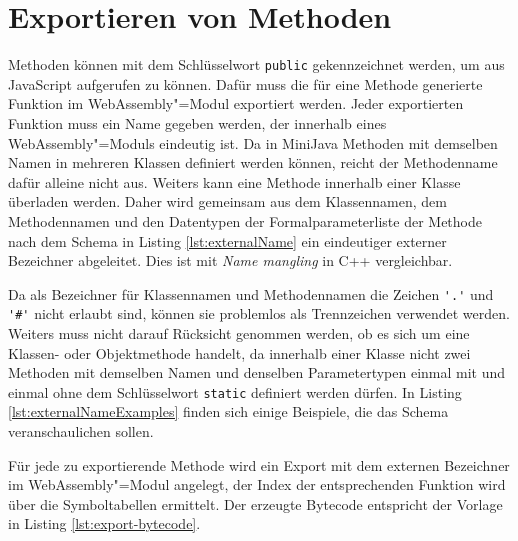 \section{Exportieren von Methoden}
\label{sec:Exportieren-von-Methoden}

Methoden können mit dem Schlüsselwort \lstinline{public} gekennzeichnet werden, um aus JavaScript aufgerufen zu können. Dafür muss die für eine Methode generierte Funktion im WebAssembly"=Modul exportiert werden. Jeder exportierten Funktion muss ein Name gegeben werden, der innerhalb eines WebAssembly"=Moduls eindeutig ist. Da in MiniJava Methoden mit demselben Namen in mehreren Klassen definiert werden können, reicht der Methodenname dafür alleine nicht aus. Weiters kann eine Methode innerhalb einer Klasse überladen werden. Daher wird gemeinsam aus dem Klassennamen, dem Methodennamen und den Datentypen der Formalparameterliste der Methode nach dem Schema in Listing \ref{lst:externalName} ein eindeutiger externer Bezeichner abgeleitet. Dies ist mit \emph{Name mangling} in C++ vergleichbar.



Da als Bezeichner für Klassennamen und Methodennamen die Zeichen \lstinline{'.'} und \lstinline{'#'} nicht erlaubt sind, können sie problemlos als Trennzeichen verwendet werden. Weiters muss nicht darauf Rücksicht genommen werden, ob es sich um eine Klassen- oder Objektmethode handelt, da innerhalb einer Klasse nicht zwei Methoden mit demselben Namen und denselben Parametertypen einmal mit und einmal ohne dem Schlüsselwort \lstinline{static} definiert werden dürfen. In Listing \ref{lst:externalNameExamples} finden sich einige Beispiele, die das Schema veranschaulichen sollen.



Für jede zu exportierende Methode wird ein Export mit dem externen Bezeichner im WebAssembly"=Modul angelegt, der Index der entsprechenden Funktion wird über die Symboltabellen ermittelt. Der erzeugte Bytecode entspricht der Vorlage in Listing \ref{lst:export-bytecode}.



